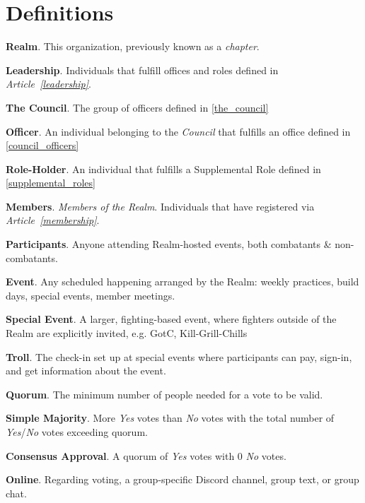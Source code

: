 \documentclass[12pt]{article}
\begin{document}
\section{Definitions}
\begin{level}
    \item \textbf{Realm}. This organization, previously known as a \emph{chapter}.
    \item \textbf{Leadership}. Individuals that fulfill offices and roles defined in \emph{Article~\ref{leadership}}.
    \item \textbf{The Council}. The group of officers defined in \ref{the_council}
    \item \textbf{Officer}. An individual belonging to the \emph{Council} that fulfills an office defined in \ref{council_officers}
    \item \textbf{Role-Holder}. An individual that fulfills a Supplemental Role defined in \ref{supplemental_roles}
    \item \textbf{Members}. \emph{Members of the Realm}. Individuals that have registered via \emph{Article~\ref{membership}}.
    \item \textbf{Participants}. Anyone attending Realm-hosted events, both combatants \& non-combatants.
    \item \textbf{Event}. Any scheduled happening arranged by the Realm: weekly practices, build days, special events, member meetings.
    \item \textbf{Special Event}. A larger, fighting-based event, where fighters outside of the Realm are explicitly invited, e.g. GotC, Kill-Grill-Chills
    \item \textbf{Troll}. The check-in set up at special events where participants can pay, sign-in, and get information about the event.
    \item \textbf{Quorum}. The minimum number of people needed for a vote to be valid.
    \item \textbf{Simple Majority}. More \emph{Yes} votes than \emph{No} votes with the total number of \emph{Yes}/\emph{No} votes exceeding quorum.
    \item \textbf{Consensus Approval}. A quorum of \emph{Yes} votes with 0 \emph{No} votes.
    \item \textbf{Online}. Regarding voting, a group-specific Discord channel, group text, or group chat.
\end{level}
\end{document}
